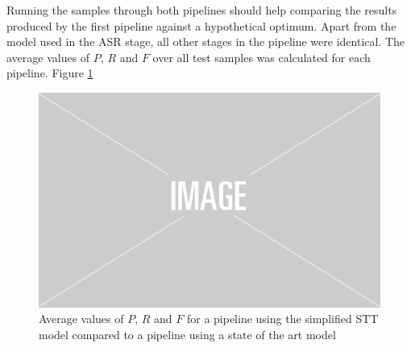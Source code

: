 Running the samples through both pipelines should help comparing the results produced by the first pipeline against a hypothetical optimum. Apart from the model used in the \ac{ASR} stage, all other stages in the pipeline were identical. The average values of $P$, $R$ and $F$ over all test samples was calculated for each pipeline. Figure \ref{pipeline_boxplot_ls_en} 

\begin{figure}
	\includegraphics[width=\linewidth]{./img/placeholder.png}
	\caption{Average values of $P$, $R$ and $F$ for a pipeline using the simplified \ac{STT} model compared to a pipeline using a state of the art model}
	\label{pipeline_boxplot_ls_en}
\end{figure}
